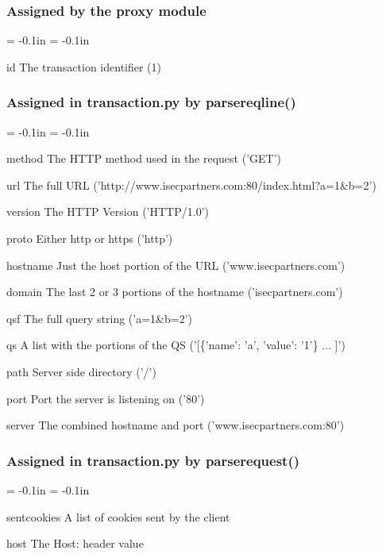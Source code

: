 \documentclass{article}
\newenvironment{mindesc}{\begin{description}\parsep = -0.1in \itemsep = -0.1in}{\end{description}}
\begin{document}
\subsubsection{Assigned by the proxy module}
\begin{mindesc}
\item[id] The transaction identifier (1)
\end{mindesc}
\subsubsection{Assigned in transaction.py by parsereqline()}
\begin{mindesc}
\item[method] The HTTP method used in the request ('GET')
\item[url] The full URL ('http://www.isecpartners.com:80/index.html?a=1\&b=2') 
\item[version] The HTTP Version ('HTTP/1.0') 
\item[proto] Either http or https ('http')
\item[hostname] Just the host portion of the URL ('www.isecpartners.com')
\item[domain] The last 2 or 3 portions of the hostname ('isecpartners.com')
\item[qsf] The full query string ('a=1\&b=2')
\item[qs] A list with the portions of the QS ('[\{'name': 'a', 'value': '1'\} ... ]')
\item[path] Server side directory ('/')
\item[port] Port the server is listening on ('80') 
\item[server] The combined hostname and port ('www.isecpartners.com:80')
\end{mindesc}
\subsubsection{Assigned in transaction.py by parserequest()}
\begin{mindesc}
\item[sentcookies] A list of cookies sent by the client
\item[host] The Host: header value
\end{mindesc}
\end{document}
